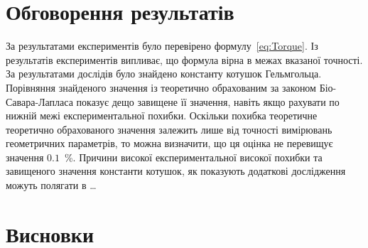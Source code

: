 \documentclass{LabWorkTemplate}
\begin{document}

\section{Обговорення результатів}



За результатами експериментів було перевірено формулу~\eqref{eq:Torque}. Із результатів експериментів випливає, що формула вірна в межах вказаної точності. За результатами дослідів було знайдено константу котушок Гельмгольца. Порівняння знайденого значення із теоретично обрахованим за законом Біо-Савара-Лапласа показує дещо завищене її значення, навіть якщо рахувати по нижній межі експериментальної похибки. Оскільки похибка теоретичне теоретично обрахованого значення залежить лише від точності вимірювань геометричних параметрів, то можна визначити, що ця оцінка не перевищує значення $0.1$~\%. Причини високої  експериментальної високої похибки та завищеного значення константи котушок, як показують додаткові дослідження можуть полягати в \ldots


\section*{Висновки}
\end{document}
